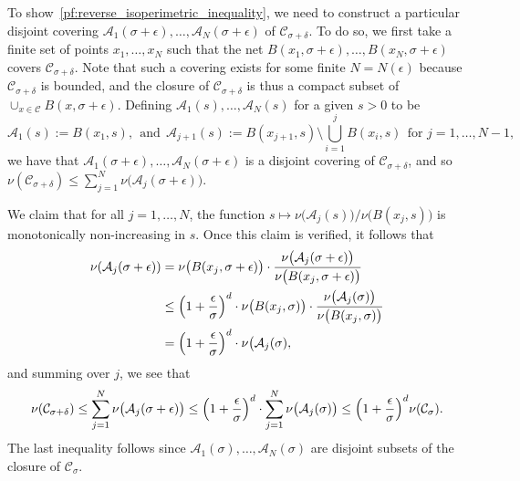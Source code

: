 \documentclass[twoside,11pt]{article}
\newcommand{\1}{\mathbf{1}}
\newcommand{\mc}[1]{\mathcal{#1}}
\begin{document}
To show~\eqref{pf:reverse_isoperimetric_inequality}, we need to construct a particular disjoint covering $\mc{A}_1(\sigma + \epsilon), \ldots, \mc{A}_N(\sigma + \epsilon)$ of $\mc{C}_{\sigma + \delta}$. To do so, we first take a finite set of points $x_1,\ldots,x_N$ such that the net $B(x_1,\sigma + \epsilon),\ldots,B(x_N,\sigma + \epsilon)$ covers $\mc{C}_{\sigma + \delta}$.  Note that such a covering exists for some finite $N = N(\epsilon)$ because $\mc{C}_{\sigma + \delta}$ is bounded, and the closure of $\mc{C}_{\sigma + \delta}$ is thus a compact subset of $\cup_{x \in \mc{C}} B(x,\sigma + \epsilon)$. Defining $\mc{A}_1(s), \ldots, \mc{A}_N(s)$ for a given $s > 0$ to be
\begin{equation*}
\mc{A}_1(s) := B(x_1,s),~~\textrm{and}~~ \mc{A}_{j + 1}(s) := B(x_{j + 1},s) \setminus \bigcup_{i = 1}^{j} B(x_i,s) ~~\textrm{for $j = 1,\ldots,N - 1$},
\end{equation*}
we have that $\mc{A}_1(\sigma + \epsilon),\ldots,\mc{A}_N(\sigma + \epsilon)$ is a disjoint covering of $\mc{C}_{\sigma + \delta}$, and so $\nu(\mc{C}_{\sigma + \delta}) \leq \sum_{j = 1}^{N} \nu\bigl(\mc{A}_j(\sigma + \epsilon)\bigr)$. 

We claim that for all $j = 1,\ldots,N$, the function $s \mapsto \nu\bigl(\mc{A}_j(s)\bigr)/\nu\bigl(B(x_j,s)\bigr)$ is monotonically non-increasing in $s$. Once this claim is verified, it follows that
\begin{align*}
\nu(\mc{A}_j(\sigma + \epsilon)) & = \nu\bigl(B(x_j,\sigma + \epsilon)\bigr) \cdot \frac{\nu\bigl(\mc{A}_j(\sigma + \epsilon)\bigr)}{\nu\bigl(B(x_j,\sigma + \epsilon)\bigr)} \\
& \leq \Bigl(1 + \frac{\epsilon}{\sigma}\Bigr)^d \cdot  \nu\bigl(B(x_j,\sigma)\bigr) \cdot \frac{\nu\bigl(\mc{A}_j(\sigma)\bigr)}{\nu\bigl(B(x_j,\sigma)\bigr)} \\
& = \Bigl(1 + \frac{\epsilon}{\sigma}\Bigr)^d \cdot \nu\bigl(\mc{A}_j(\sigma),
\end{align*}
and summing over $j$, we see that
\begin{equation*}
\nu(\mc{C}_{\sigma + \delta}) \leq \sum_{j = 1}^{N} \nu\bigl(\mc{A}_j(\sigma + \epsilon)\bigr) \leq \Bigl(1 + \frac{\epsilon}{\sigma}\Bigr)^d \cdot \sum_{j = 1}^{N} \nu\bigl(\mc{A}_j(\sigma)\bigr) \leq \Bigl(1 + \frac{\epsilon}{\sigma}\Bigr)^d \nu(\mc{C}_{\sigma}).
\end{equation*}
The last inequality follows since $\mc{A}_1(\sigma),\ldots,\mc{A}_N(\sigma)$ are disjoint subsets of the closure of $\mc{C}_{\sigma}$.
\end{document}
